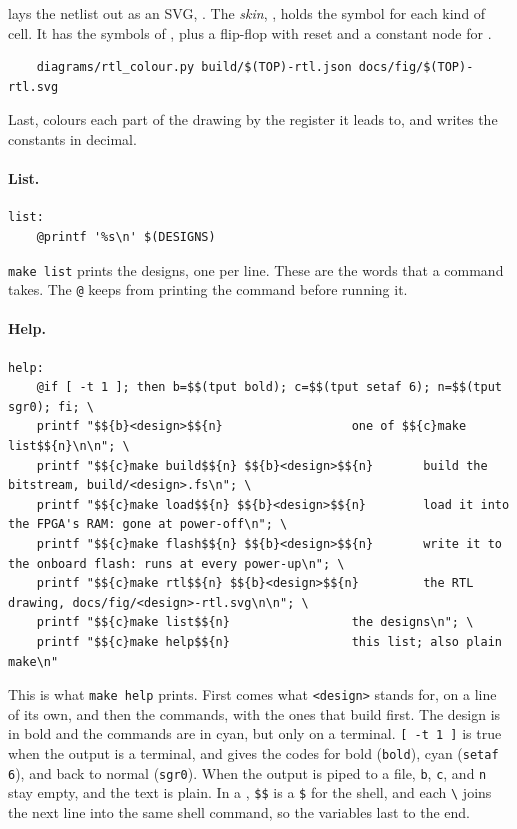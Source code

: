 \documentclass[11pt,a4paper]{article}
\begin{document}
 lays the netlist out as an SVG, . The \emph{skin}, , holds the symbol for each kind of cell. It has the symbols of , plus a flip-flop with reset and a constant node for .

\begin{verbatim}
	diagrams/rtl_colour.py build/$(TOP)-rtl.json docs/fig/$(TOP)-rtl.svg
\end{verbatim}

Last,  colours each part of the drawing by the register it leads to, and writes the constants in decimal.

\paragraph{List.}

\begin{verbatim}
list:
	@printf '%s\n' $(DESIGNS)
\end{verbatim}

\texttt{make list} prints the designs, one per line. These are the words that a command takes. The \texttt{@} keeps  from printing the command before running it.

\paragraph{Help.}

\begin{verbatim}
help:
	@if [ -t 1 ]; then b=$$(tput bold); c=$$(tput setaf 6); n=$$(tput sgr0); fi; \
	printf "$${b}<design>$${n}                  one of $${c}make list$${n}\n\n"; \
	printf "$${c}make build$${n} $${b}<design>$${n}       build the bitstream, build/<design>.fs\n"; \
	printf "$${c}make load$${n} $${b}<design>$${n}        load it into the FPGA's RAM: gone at power-off\n"; \
	printf "$${c}make flash$${n} $${b}<design>$${n}       write it to the onboard flash: runs at every power-up\n"; \
	printf "$${c}make rtl$${n} $${b}<design>$${n}         the RTL drawing, docs/fig/<design>-rtl.svg\n\n"; \
	printf "$${c}make list$${n}                 the designs\n"; \
	printf "$${c}make help$${n}                 this list; also plain make\n"
\end{verbatim}

This is what \texttt{make help} prints. First comes what \texttt{<design>} stands for, on a line of its own, and then the commands, with the ones that build first. The design is in bold and the commands are in cyan, but only on a terminal. \texttt{[ -t 1 ]} is true when the output is a terminal, and  gives the codes for bold (\texttt{bold}), cyan (\texttt{setaf 6}), and back to normal (\texttt{sgr0}). When the output is piped to a file, \texttt{b}, \texttt{c}, and \texttt{n} stay empty, and the text is plain. In a , \texttt{\$\$} is a \texttt{\$} for the shell, and each \texttt{\textbackslash} joins the next line into the same shell command, so the variables last to the end.
\end{document}
